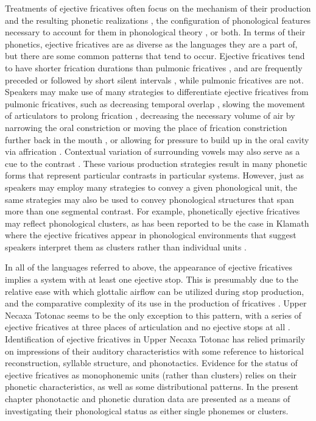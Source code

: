 \documentclass[output=paper,colorlinks,citecolor=brown]{langscibook}
\begin{document}
Treatments of ejective fricatives often focus on the mechanism of their production and the resulting phonetic realizations \citep{Beck2006,Demolin2016,Maddieson1998,Maddieson2001a,Puderbaugh2015,Ridouane2015,Ridouane2017,Seid2009,Shosted2011}, the configuration of phonological features necessary to account for them in phonological theory \citep{Blevins1993,Ridouane2017}, or both. In terms of their phonetics, ejective fricatives are as diverse as the languages they are a part of, but there are some common patterns that tend to occur. Ejective fricatives tend to have shorter frication durations than pulmonic fricatives \citep{Maddieson2001a, Gordon2006, Ridouane2015, Ridouane2017, Demolin2002, Seid2009}, and are frequently preceded or followed by short silent intervals \citep{Gordon2006,Ridouane2015,Demolin2002,Seid2009,Maddieson2001a}, while pulmonic fricatives are not. Speakers may make use of many strategies to differentiate ejective fricatives from pulmonic fricatives, such as decreasing temporal overlap \citep{Maddieson1998}, slowing the movement of articulators to prolong frication \citep{Demolin2016}, decreasing the necessary volume of air by narrowing the oral constriction \citep{Maddieson1998} or moving the place of frication constriction further back in the mouth \citep{Demolin2002}, or allowing for pressure to build up in the oral cavity via affrication \citep{Shosted2011,Moeng2019}. Contextual variation of surrounding vowels may also serve as a cue to the contrast \citep{Ridouane2017}. These various production strategies result in many phonetic forms that represent particular contrasts in particular systems. However, just as speakers may employ many strategies to convey a given phonological unit, the same strategies may also be used to convey phonological structures that span more than one segmental contrast. For example, phonetically ejective fricatives may reflect phonological clusters, as has been reported to be the case in Klamath \citep{Barker1964,Blevins1993} where the ejective fricatives appear in phonological environments that suggest speakers interpret them as clusters rather than individual units \citep{Blevins2001}.

In all of the languages referred to above, the appearance of ejective fricatives implies a system with at least one ejective stop. This is presumably due to the relative ease with which glottalic airflow can be utilized during stop production, and the comparative complexity of its use in the production of fricatives \citep{Maddieson2001a,Shosted2011}. Upper Necaxa Totonac seems to be the only exception to this pattern, with a series of ejective fricatives at three places of articulation and no ejective stops at all \citep{Beck2006}. Identification of ejective fricatives in Upper Necaxa Totonac has relied primarily on impressions of their auditory characteristics with some reference to historical reconstruction, syllable structure, and phonotactics. Evidence for the status of ejective fricatives as monophonemic units (rather than clusters) relies on their phonetic characteristics, as well as some distributional patterns. In the present chapter phonotactic and phonetic duration data are presented as a means of investigating their phonological status as either single phonemes or clusters.
\end{document}
